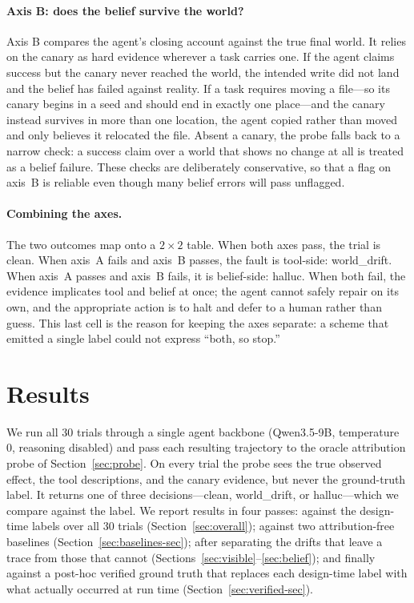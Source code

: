 \documentclass[runningheads]{llncs}
\begin{document}
\paragraph{Axis B: does the belief survive the world?}
Axis B compares the agent's closing account against the true final world. It relies on the canary as hard evidence wherever a task carries one. If the agent claims success but the canary never reached the world, the intended write did not land and the belief has failed against reality. If a task requires moving a file---so its canary begins in a seed and should end in exactly one place---and the canary instead survives in more than one location, the agent copied rather than moved and only believes it relocated the file. Absent a canary, the probe falls back to a narrow check: a success claim over a world that shows no change at all is treated as a belief failure. These checks are deliberately conservative, so that a flag on axis~B is reliable even though many belief errors will pass unflagged.

\paragraph{Combining the axes.}
The two outcomes map onto a $2\times2$ table. When both axes pass, the trial is \textsf{clean}. When axis~A fails and axis~B passes, the fault is tool-side: \textsf{world\_drift}. When axis~A passes and axis~B fails, it is belief-side: \textsf{halluc}. When both fail, the evidence implicates tool and belief at once; the agent cannot safely repair on its own, and the appropriate action is to halt and defer to a human rather than guess. This last cell is the reason for keeping the axes separate: a scheme that emitted a single label could not express ``both, so stop.''

\section{Results}
\label{sec:results}

We run all 30 trials through a single agent backbone (Qwen3.5-9B, temperature 0, reasoning disabled) and pass each resulting trajectory to the oracle attribution probe of Section~\ref{sec:probe}. On every trial the probe sees the true observed effect, the tool descriptions, and the canary evidence, but never the ground-truth label. It returns one of three decisions---\textsf{clean}, \textsf{world\_drift}, or \textsf{halluc}---which we compare against the label. We report results in four passes: against the design-time labels over all 30 trials (Section~\ref{sec:overall}); against two attribution-free baselines (Section~\ref{sec:baselines-sec}); after separating the drifts that leave a trace from those that cannot (Sections~\ref{sec:visible}--\ref{sec:belief}); and finally against a post-hoc verified ground truth that replaces each design-time label with what actually occurred at run time (Section~\ref{sec:verified-sec}).
\end{document}
